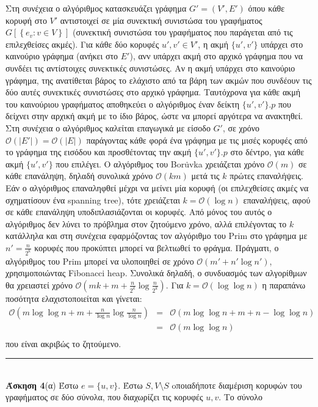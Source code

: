 \documentclass[12pt]{article}
\newcommand\en[1]{\latintext #1\greektext}
\newcommand\bigOh{\mathcal{O}}
\newcommand{\HRule}{\rule{\linewidth}{0.1mm}}
\begin{document}
Στη συνέχεια ο αλγόριθμος κατασκευάζει γράφημα $G'=(V',E')$ όπου κάθε κορυφή στο $V'$ αντιστοιχεί σε μία συνεκτική συνιστώσα του γραφήματος $G\left[\left\{e_v:v\in V\right\}\right]$ (συνεκτική συνιστώσα του γραφήματος που παράγεται από τις επιλεχθείσες ακμές). Για κάθε δύο κορυφές $u',v'\in V'$, η ακμή $\{u',v'\}$ υπάρχει στο καινούριο γράφημα (ανήκει στο $E'$), ανν υπάρχει ακμή στο αρχικό γράφημα που να συνδέει τις αντίστοιχες συνεκτικές συνιστώσες. Αν η ακμή υπάρχει στο καινούριο γράφημα, της ανατίθεται βάρος το ελάχιστο από τα βάρη των ακμών που συνδέουν τις δύο αυτές συνεκτικές συνιστώσες στο αρχικό γράφημα. Ταυτόχρονα για κάθε ακμή του καινούριου γραφήματος αποθηκεύει ο αλγόριθμος έναν δείκτη $\{u',v'\}.p$ που δείχνει στην αρχική ακμή με το ίδιο βάρος, ώστε να μπορεί αργότερα να ανακτηθεί. Στη συνέχεια ο αλγόριθμος κα\-λεί\-ται επαγωγικά με είσοδο $G'$, σε χρόνο $\bigOh(|E'|)=\bigOh(|E|)$ παράγοντας κάθε φορά ένα γράφημα με τις μισές κορυφές από το γράφημα της εισόδου και προσθέτοντας την ακμή $\{u',v'\}.p$ στο δέντρο, για κάθε ακμή $\{u',v'\}$ που επιλέγει. Ο αλγόριθμος του \en{Bor\.uvka} χρειάζεται χρόνο $\bigOh(m)$ σε κάθε επανάληψη, δηλαδή συνολικά χρόνο $\bigOh(km)$ μετά τις $k$ πρώτες επαναλήψεις. Εάν ο αλγόριθμος επαναληφθεί μέχρι να μείνει μία κορυφή (οι επιλεχθείσες ακμές να σχηματίσουν ένα \en{spanning tree}), τότε χρειάζεται $k=\bigOh(\log n)$ επαναλήψεις, αφού σε κάθε επανάληψη υποδιπλασιάζονται οι κορυφές. Από μόνος του αυτός ο αλγόριθμος δεν λύνει το πρόβλημα στον ζητούμενο χρόνο, αλλά επιλέγοντας το $k$ κατάλληλα και στη συνέχεια εφαρμόζοντας τον αλγόριθμο του \en{Prim} στο γράφημα με $n'=\frac{n}{2^k}$ κορυφές που προκύπτει μπορεί να βελτιωθεί το φράγμα. Πράγματι, ο αλγόριθμος του \en{Prim} μπορεί να υλοποιηθεί σε χρόνο $\bigOh(m'+n'\log n')$, χρησιμοποιώντας \en{Fibonacci heap}. Συνολικά δηλαδή, ο συνδυασμός των αλγορίθμων θα χρειαστεί χρόνο $\bigOh\left(mk+m+\frac{n}{2^k}\log\frac{n}{2^k}\right)$. Για $k=\bigOh(\log\log n)$ η παραπάνω ποσότητα ελαχιστοποιείται και γίνεται:
$$\begin{array}{rcl}\bigOh\left(m\log\log n+m+\frac{n}{\log n}\log\frac{n}{\log n}\right)
&=&\bigOh\left(m\log\log n+m+n-\log\log n\right)\\
&=&\bigOh\left(m\log\log n\right)\\
\end{array}$$
που είναι ακριβώς το ζητούμενο.\\
\HRule\\
{\bf Άσκηση 4}(α) Έστω $e=\{u,v\}$. Έστω $S,V\setminus S$ oποιαδήποτε διαμέριση κορυφών του γραφήματος σε δύο σύνολα, που διαχωρίζει τις κορυφές $u,v$. Το σύνολο
\end{document}
